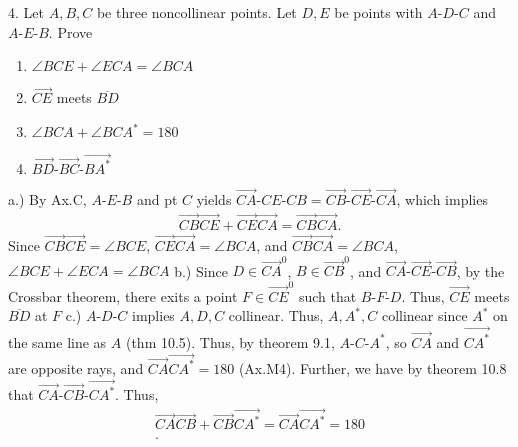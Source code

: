\documentclass{report}
\begin{document}
    \pagebreak 
    \bigbreak \noindent 
    \begin{mdframed}
        4. Let $A,B,C$ be three noncollinear points. Let $D,E$ be points with $ A\text{-}D\text{-}C$ and $ A\text{-}E\text{-}B$. Prove
        \begin{enumerate}[label=(\alph*)]
            \item $\angle BCE + \angle   ECA = \angle BCA$ 
            \item $\overrightarrow{CE}$ meets $\overline{BD} $
            \item $\angle BCA + \angle BCA^{*}  = 180$
            \item $ \overrightarrow{BD}\text{-}\overrightarrow{BC}\text{-}\overrightarrow{BA^{*}} $
        \end{enumerate}
    \end{mdframed}
    \bigbreak \noindent 
    a.) By Ax.C, $ A\text{-}E\text{-}B$ and pt $C$ yields $ \overrightarrow{CA}\text{-}CE\text{-}CB = \overrightarrow{CB}\text{-}\overrightarrow{CE}\text{-}\overrightarrow{CA}$, which implies
    \begin{align*}
        \overrightarrow{CB}\overrightarrow{CE} + \overrightarrow{CE}\overrightarrow{CA} = \overrightarrow{CB}\overrightarrow{CA}
    .\end{align*}
    Since $\overrightarrow{CB}\overrightarrow{CE} = \angle BCE$, $\overrightarrow{CE}\overrightarrow{CA} = \angle BCA$, and $\overrightarrow{CB}\overrightarrow{CA} = \angle BCA$, $ \angle BCE + \angle ECA = \angle BCA$
    \bigbreak \noindent 
    b.) Since $D \in \overrightarrow{CA}^{0}$, $B \in \overrightarrow{CB}^{0} $, and $ \overrightarrow{CA}\text{-}\overrightarrow{CE}\text{-}\overrightarrow{CB} $, by the Crossbar theorem, there exits a point $F \in \overrightarrow{CE}^{0}$ such that $ B\text{-}F\text{-}D$. Thus, $ \overrightarrow{CE}$ meets $ \overline{BD}$ at $F$
    \bigbreak \noindent 
    c.) $ A\text{-}D\text{-}C$ implies $ A,D,C$ collinear. Thus, $A,A^{*}, C$ collinear since $A^{*}$ on the same line as $A$ (thm 10.5). Thus, by theorem 9.1, $ A\text{-}C\text{-}A^{*}$, so $\overrightarrow{CA}$ and $\overrightarrow{CA^{*}} $ are opposite rays, and $ \overrightarrow{CA}\overrightarrow{CA^{*}}  = 180$ (Ax.M4). Further, we have by theorem 10.8 that $ \overrightarrow{CA}\text{-}\overrightarrow{CB}\text{-}\overrightarrow{CA^{*}} $. Thus, 
    \begin{align*}
        \overrightarrow{CA}\overrightarrow{CB} + \overrightarrow{CB}\overrightarrow{CA^{*}} = \overrightarrow{CA}\overrightarrow{CA^{*}} = 180 \\
    .\end{align*}
\end{document}
